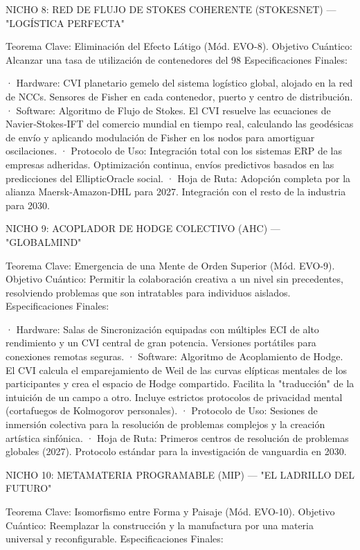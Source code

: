 \documentclass[12pt,a4paper]{book}
\begin{document}
NICHO 8: RED DE FLUJO DE STOKES COHERENTE (STOKESNET) — "LOGÍSTICA PERFECTA"

Teorema Clave: Eliminación del Efecto Látigo (Mód. EVO-8).
Objetivo Cuántico: Alcanzar una tasa de utilización de contenedores del 98%
Especificaciones Finales:

· Hardware: CVI planetario gemelo del sistema logístico global, alojado en la red de NCCs. Sensores de Fisher en cada contenedor, puerto y centro de distribución.
· Software: Algoritmo de Flujo de Stokes. El CVI resuelve las ecuaciones de Navier‑Stokes‑IFT del comercio mundial en tiempo real, calculando las geodésicas de envío y aplicando modulación de Fisher en los nodos para amortiguar oscilaciones.
· Protocolo de Uso: Integración total con los sistemas ERP de las empresas adheridas. Optimización continua, envíos predictivos basados en las predicciones del EllipticOracle social.
· Hoja de Ruta: Adopción completa por la alianza Maersk‑Amazon‑DHL para 2027. Integración con el resto de la industria para 2030.

NICHO 9: ACOPLADOR DE HODGE COLECTIVO (AHC) — "GLOBALMIND"

Teorema Clave: Emergencia de una Mente de Orden Superior (Mód. EVO-9).
Objetivo Cuántico: Permitir la colaboración creativa a un nivel sin precedentes, resolviendo problemas que son intratables para individuos aislados.
Especificaciones Finales:

· Hardware: Salas de Sincronización equipadas con múltiples ECI de alto rendimiento y un CVI central de gran potencia. Versiones portátiles para conexiones remotas seguras.
· Software: Algoritmo de Acoplamiento de Hodge. El CVI calcula el emparejamiento de Weil de las curvas elípticas mentales de los participantes y crea el espacio de Hodge compartido. Facilita la "traducción" de la intuición de un campo a otro. Incluye estrictos protocolos de privacidad mental (cortafuegos de Kolmogorov personales).
· Protocolo de Uso: Sesiones de inmersión colectiva para la resolución de problemas complejos y la creación artística sinfónica.
· Hoja de Ruta: Primeros centros de resolución de problemas globales (2027). Protocolo estándar para la investigación de vanguardia en 2030.

NICHO 10: METAMATERIA PROGRAMABLE (MIP) — "EL LADRILLO DEL FUTURO"

Teorema Clave: Isomorfismo entre Forma y Paisaje (Mód. EVO-10).
Objetivo Cuántico: Reemplazar la construcción y la manufactura por una materia universal y reconfigurable.
Especificaciones Finales:
\end{document}
